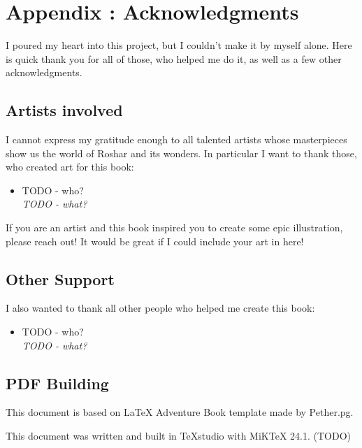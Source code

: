 \chapter{Appendix \thechapter{}: Acknowledgments}
\label{chap:acknowledgments}

I poured my heart into this project, but I couldn't make it by myself alone. Here is quick thank you for all of those, who helped me do it, as well as a few other acknowledgments. 

\section{Artists involved}

I cannot express my gratitude enough to all talented artists whose masterpieces show us the world of Roshar and its wonders. In particular I want to thank those, who created art for this book:

\begin{itemize}
	\item TODO - who? \\
	\textit{TODO - what?}
\end{itemize}

If you are an artist and this book inspired you to create some epic illustration, please reach out! It would be great if I could include your art in here!

\section{Other Support}

I also wanted to thank all other people who helped me create this book:

\begin{itemize}
	\item TODO - who? \\
	\textit{TODO - what?} 
\end{itemize}


\section{PDF Building} 

This document is based on LaTeX Adventure Book template made by Pether.pg.

This document was written and built in TeXstudio with MiKTeX 24.1. (TODO)

